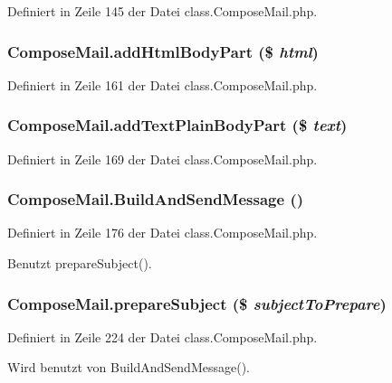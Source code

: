 Definiert in Zeile 145 der Datei class.ComposeMail.php.
\subsubsection{\setlength{\rightskip}{0pt plus 5cm}ComposeMail.addHtmlBodyPart (\$ {\em html})}\label{classComposeMail_2edba24fcfda40a085c85d8a4f2fa3e9}




Definiert in Zeile 161 der Datei class.ComposeMail.php.
\subsubsection{\setlength{\rightskip}{0pt plus 5cm}ComposeMail.addTextPlainBodyPart (\$ {\em text})}\label{classComposeMail_b3cf8d50e9d226367d46b537964583ea}




Definiert in Zeile 169 der Datei class.ComposeMail.php.
\subsubsection{\setlength{\rightskip}{0pt plus 5cm}ComposeMail.BuildAndSendMessage ()}\label{classComposeMail_2b975db2e14a75fb8edd8d5bcfa1b39d}




Definiert in Zeile 176 der Datei class.ComposeMail.php.

Benutzt prepareSubject().
\subsubsection{\setlength{\rightskip}{0pt plus 5cm}ComposeMail.prepareSubject (\$ {\em subjectToPrepare})}\label{classComposeMail_354f895e00f1a95fb7083023acd64190}




Definiert in Zeile 224 der Datei class.ComposeMail.php.

Wird benutzt von BuildAndSendMessage().

